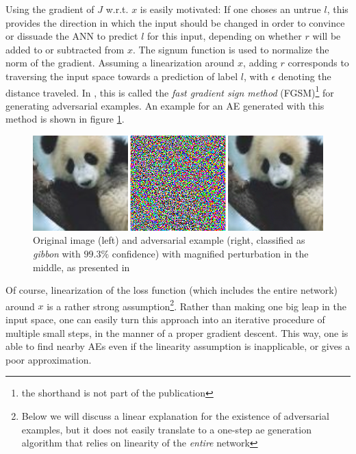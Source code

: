 \documentclass[11pt, a4paper]{article}
\begin{document}
Using the gradient of $J$ w.r.t. $x$ is easily motivated: If one choses an untrue $l$, this provides the direction in which the input should be changed in order to convince or dissuade the ANN to predict $l$ for this input, depending on whether $r$ will be added to or subtracted from $x$. The signum function is used to normalize the norm of the gradient. Assuming a linearization around $x$, adding $r$ corresponds to traversing the input space towards a prediction of label $l$, with $\epsilon$ denoting the distance traveled. In \cite{explaining-and-harnessing-adversarial-examples}, this is called the \emph{fast gradient sign method} (FGSM)\footnote{the shorthand is not part of the publication} for generating adversarial examples. An example for an AE generated with this method is shown in figure \ref{fig:harnessing-ae}.

\begin{figure}[h!tb]
	\centering
	\includegraphics[width=\textwidth]{images/harnessing_ae.png}
	\caption[Adversarial example created via FGSM, from \cite{explaining-and-harnessing-adversarial-examples}]{Original image (left) and adversarial example (right, classified as \emph{gibbon} with $99.3\%$ confidence) with magnified perturbation in the middle, as presented in \cite{explaining-and-harnessing-adversarial-examples}}
	\label{fig:harnessing-ae}
\end{figure}

Of course, linearization of the loss function (which includes the entire network) around $x$ is a rather strong assumption\footnote{Below we will discuss a linear explanation for the existence of adversarial examples, but it does not easily translate to a one-step ae generation algorithm that relies on linearity of the \emph{entire} network}. Rather than making one big leap in the input space, one can easily turn this approach into an iterative procedure of multiple small steps, in the manner of a proper gradient descent. This way, one is able to find nearby AEs even if the linearity assumption is inapplicable, or gives a poor approximation.
\end{document}
